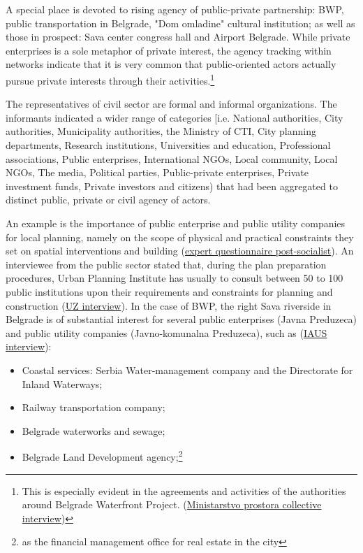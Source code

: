 \documentclass[11pt]{report}
\begin{document}
A special place is devoted to rising agency of public-private partnership: BWP, public transportation in Belgrade, "Dom omladine" cultural institution; as well as those in prospect: Sava center congress hall and Airport Belgrade. 
While private enterprises is a sole metaphor of private interest, the agency tracking within networks indicate that it is very common that public-oriented actors actually pursue private interests through their activities.\footnote{This is especially evident in the agreements and activities of the authorities around Belgrade Waterfront Project. (\href{}{Ministarstvo prostora collective interview})}

The representatives of civil sector are formal and informal organizations. 
The informants indicated a wider range of categories [i.e. National authorities, City authorities, Municipality authorities, the Ministry of CTI, City planning departments, Research institutions, Universities and education, Professional associations, Public enterprises, International NGOs, Local community, Local NGOs, The media, Political parties, Public-private enterprises, Private investment funds, Private investors and citizens) that had been aggregated to distinct public, private or civil agency of actors.

An example is the importance of public enterprise and public utility companies for local planning, namely on the scope of physical and practical constraints they set on spatial interventions and building (\href{}{expert questionnaire post-socialist}).
An interviewee from the public sector stated that, during the plan preparation procedures, Urban Planning Institute has usually to consult between 50 to 100 public institutions upon their requirements and constraints for planning and construction (\href{}{UZ interview}).
In the case of BWP, the right Sava riverside in Belgrade is of substantial interest for several public enterprises (Javna Preduzeca) and public utility companies (Javno-komunalna Preduzeca), such as (\href{}{IAUS interview}): 

\begin{itemize}
\item Coastal services: Serbia Water-management company and the Directorate for Inland Waterways;
\item Railway transportation company;
\item Belgrade waterworks and sewage;
\item Belgrade Land Development agency;\footnote{as the financial management office for real estate in the city}
\end{itemize}
\end{document}
